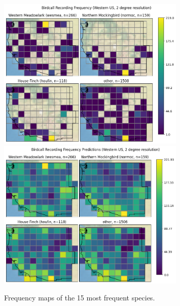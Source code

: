 \documentclass[notitlepage]{article}
\begin{document}
\begin{figure}[H]
\centering
\includegraphics[width=0.8\textwidth]{report/figures/western_us_raw_4.png}
\includegraphics[width=0.8\textwidth]{report/figures/western_us_predict_4.png}
\caption{Frequency maps of the 15 most frequent species.}
\label{fig:map_4}
\end{figure}
\end{document}
